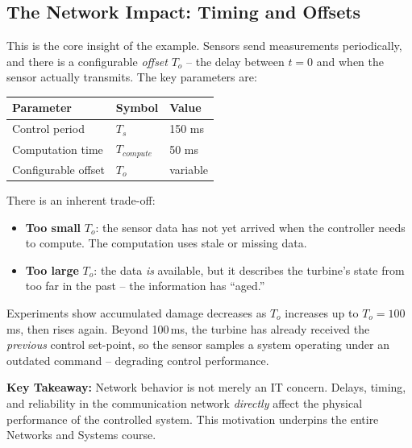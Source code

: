 \subsection{The Network Impact: Timing and Offsets}

This is the core insight of the example. Sensors send measurements
periodically, and there is a configurable \emph{offset} $T_o$ -- the delay
between $t=0$ and when the sensor actually transmits. The key parameters are:

\begin{center}
\begin{tabular}{lll}
\toprule
\textbf{Parameter} & \textbf{Symbol} & \textbf{Value} \\
\midrule
Control period      & $T_s$       & 150 ms \\
Computation time    & $T_{compute}$& 50 ms  \\
Configurable offset & $T_o$       & variable \\
\bottomrule
\end{tabular}
\end{center}

There is an inherent trade-off:

\begin{itemize}[leftmargin=1.5em]
    \item \textbf{Too small} $T_o$: the sensor data has not yet arrived when
    the controller needs to compute. The computation uses stale or missing data.

    \item \textbf{Too large} $T_o$: the data \emph{is} available, but it
    describes the turbine's state from too far in the past -- the information
    has ``aged.''
\end{itemize}

Experiments show accumulated damage decreases as $T_o$ increases up to
$T_o = 100$\,ms, then rises again. Beyond 100\,ms, the turbine has already
received the \emph{previous} control set-point, so the sensor samples a system
operating under an outdated command -- degrading control performance.

\begin{mdframed}[backgroundcolor=lightgray, linewidth=0pt, innertopmargin=8pt,
innerbottommargin=8pt]
\textbf{Key Takeaway:} Network behavior is not merely an IT concern. Delays,
timing, and reliability in the communication network \emph{directly} affect the
physical performance of the controlled system. This motivation underpins the
entire Networks and Systems course.
\end{mdframed}

